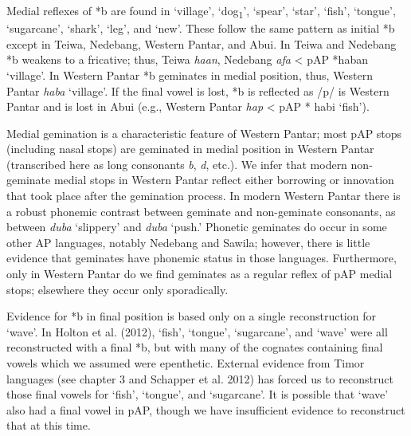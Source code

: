 Medial reflexes of *b are found in {\textquoteleft}village{\textquoteright}, {\textquoteleft}dog\textsubscript{1}{\textquoteright}, {\textquoteleft}spear{\textquoteright}, {\textquoteleft}star{\textquoteright}, {\textquoteleft}fish{\textquoteright}, {\textquoteleft}tongue{\textquoteright}, {\textquoteleft}sugarcane{\textquoteright}, {\textquoteleft}shark{\textquoteright}, {\textquoteleft}leg{\textquoteright}, and {\textquoteleft}new{\textquoteright}. These follow the same pattern as initial *b except in Teiwa, Nedebang, Western Pantar, and Abui. In Teiwa and Nedebang *b weakens to a fricative; thus, Teiwa \textit{ha{\textphi}an}, Nedebang \textit{afa{\ng}} {\textless} pAP *haban {\textquoteleft}village{\textquoteright}. In Western Pantar *b geminates in medial position, thus, Western Pantar \textit{hab{\textlengthmark}a{\ng}} {\textquoteleft}village{\textquoteright}. If the final vowel is lost, *b is reflected as /p/ is Western Pantar and is lost in Abui (e.g., Western Pantar \textit{hap} {\textless} pAP *
habi {\textquoteleft}fish{\textquoteright}). 

Medial gemination is a characteristic feature of Western Pantar; most pAP stops (including nasal stops) are geminated in medial position in Western Pantar (transcribed here as long consonants\textit{ b{\textlengthmark}},\textit{ d{\textlengthmark}}, etc.). We infer that modern non-geminate medial stops in Western Pantar reflect either borrowing or innovation that took place after the gemination process. In modern Western Pantar there is a robust phonemic contrast between geminate and non-geminate consonants, as between \textit{duba }{\textquoteleft}slippery{\textquoteright} and \textit{dub{\textlengthmark}a }{\textquoteleft}push.{\textquoteright} Phonetic geminates do occur in some other AP languages, notably Nedebang and Sawila; however, there is little evidence that geminates have phonemic status in those languages. Furthermore, only in Western Pantar do we find geminates as a regular reflex of pAP medial stops; elsewhere they occur only sporadically. 

Evidence for *b in final position is based only on a single reconstruction for {\textquoteleft}wave{\textquoteright}. In Holton et al. (2012), {\textquoteleft}fish{\textquoteright}, {\textquoteleft}tongue{\textquoteright}, {\textquoteleft}sugarcane{\textquoteright}, and {\textquoteleft}wave{\textquoteright} were all reconstructed with a final *b, but with many of the cognates containing final vowels which we assumed were epenthetic. External evidence from Timor languages (see chapter 3 and Schapper et al. 2012) has forced us to reconstruct those final vowels for {\textquoteleft}fish{\textquoteright}, {\textquoteleft}tongue{\textquoteright}, and {\textquoteleft}sugarcane{\textquoteright}. It is possible that {\textquoteleft}wave{\textquoteright} also had a final vowel in pAP, though we have insufficient evidence to reconstruct that at this time.

